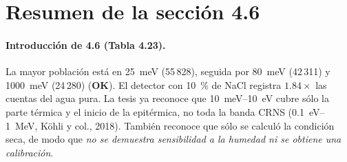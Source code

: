 \documentclass[11pt,a4paper]{article}
\newcommand{\ok}{\textcolor{green!50!black}{\textbf{OK}}}
\begin{document}
\section{Resumen de la sección 4.6}

\paragraph{Introducción de 4.6 (Tabla 4.23).} La mayor población está en 25~meV (55\,828),
seguida por 80~meV (42\,311) y 1000~meV (24\,280) (\ok). El detector con 10~\% de NaCl registra
$1.84\times$ las cuentas del agua pura. La tesis ya reconoce que 10~meV--10~eV cubre sólo la
parte térmica y el inicio de la epitérmica, no toda la banda CRNS (0.1~eV--1~MeV, Köhli y col.,
2018). También reconoce que sólo se calculó la condición seca, de modo que \emph{no se demuestra
sensibilidad a la humedad ni se obtiene una calibración}.
\end{document}
